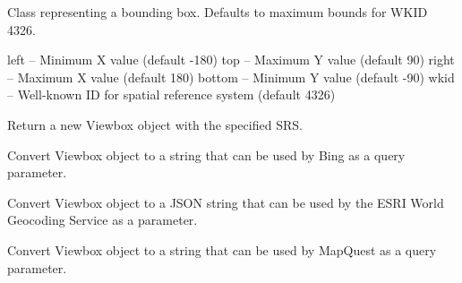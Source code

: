 \documentclass[letterpaper,10pt,english]{sphinxmanual}
\begin{document}

\begin{fulllineitems}
\label{index:omgeo.places.Viewbox}
Class representing a bounding box.
Defaults to maximum bounds for WKID 4326.

left    -- Minimum X value (default -180)
top     -- Maximum Y value (default 90)
right   -- Maximum X value (default 180)
bottom  -- Minimum Y value (default -90)
wkid    -- Well-known ID for spatial reference system (default 4326)

\begin{fulllineitems}
\label{index:omgeo.places.Viewbox.convert_srs}
Return a new Viewbox object with the specified SRS.

\end{fulllineitems}


\begin{fulllineitems}
\label{index:omgeo.places.Viewbox.to_bing_str}
Convert Viewbox object to a string that can be used by Bing
as a query parameter.

\end{fulllineitems}


\begin{fulllineitems}
\label{index:omgeo.places.Viewbox.to_esri_wgs_json}
Convert Viewbox object to a JSON string that can be used
by the ESRI World Geocoding Service as a parameter.

\end{fulllineitems}


\begin{fulllineitems}
\label{index:omgeo.places.Viewbox.to_mapquest_str}
Convert Viewbox object to a string that can be used by
MapQuest as a query parameter.

\end{fulllineitems}


\end{fulllineitems}
\end{document}
